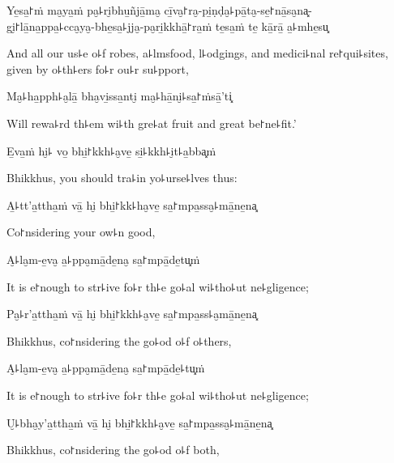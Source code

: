 Ye̱sa̱꜓ṁ ma̮ya̱ṁ pa̮꜕ri̮bhu̱ñjā̱ma̮ cī̱va̮꜓ra̮-pi̱ṇḍa̮꜕pā̱ta̮-se̱꜓nā̱sa̮na͓-\\
gi̮꜓lā̱na̱ppa̱꜕cca̮ya̮-bhe̱sa̱꜕jja̮-pa̮ri̱kkhā̱꜓ra̱ṁ te̱sa̱ṁ te̱ kā̱rā̱ a̱꜕mhe̱su͓

\begin{english}
  And all our us꜕e o꜕f robes, a꜕lmsfood, l꜕odgings, and medici꜕nal
  re꜓qui꜕sites, given by o꜕th꜕ers fo꜕r ou꜕r su꜕pport,
\end{english}

Ma̮꜕ha̱pph꜕a̮lā̱ bha̮vi̱ssa̱nti̮ ma̮꜕hā̱ni̮꜕sa̱꜓ṁsā̱'ti͓

\begin{english}
  Will rewa꜕rd th꜕em wi꜕th gre꜕at fruit and great be꜓ne꜕fit.'
\end{english}

E̱va̱ṁ hi̮꜕ vo̱ bhi̱꜓kkh꜕a̮ve̱ si̱꜕kkh꜕i̮t꜕a̱bba͓ṁ

\begin{english}
  Bhikkhus, you should tra꜕in yo꜕urse꜕lves thus:
\end{english}

A̱꜕tt'a̱ttha̱ṁ vā̱ hi̮ bhi̱꜓kk꜕ha̮ve̱ sa̱꜓mpa̱ssa̮꜕mā̱ne̱na͓

\begin{english}
  Co꜓nsidering your ow꜕n good,
\end{english}

A̮꜕la̮m-e̱va̮ a̱꜕ppa̮mā̱de̱na̮ sa̱꜓mpā̱de̱tu͓ṁ

\begin{english}
  It is e꜓nough to str꜕ive fo꜕r th꜕e go꜕al wi꜕tho꜕ut ne꜕gligence;
\end{english}

Pa̮꜕r'a̱ttha̱ṁ vā̱ hi̮ bhi̱꜓kkh꜕a̮ve̱ sa̱꜓mpa̱ss꜕a̮mā̱ne̱na͓

\begin{english}
  Bhikkhus, co꜓nsidering the go꜕od o꜕f o꜕thers,
\end{english}

A̮꜕la̮m-e̱va̮ a̱꜕ppa̮mā̱de̱na̮ sa̱꜓mpā̱de̱꜕tu͓ṁ

\begin{english}
  It is e꜓nough to str꜕ive fo꜕r th꜕e go꜕al wi꜕tho꜕ut ne꜕gligence;
\end{english}

U̮꜕bha̮y'a̱ttha̱ṁ vā̱ hi̮ bhi̱꜓kkh꜕a̮ve̱ sa̱꜓mpa̱ssa̮꜕mā̱ne̱na͓

\begin{english}
  Bhikkhus, co꜓nsidering the go꜕od o꜕f both,
\end{english}

